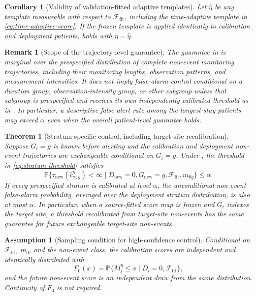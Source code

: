 \documentclass[11pt]{article}
\newtheorem{assumption}{Assumption}
\newtheorem{theorem}{Theorem}
\newtheorem{corollary}{Corollary}
\newtheorem{remark}{Remark}
\newcommand{\Pp}{\mathbb{P}}
\newcommand{\calF}{\mathcal{F}}
\begin{document}
\begin{corollary}[Validity of validation-fitted adaptive templates]\label{cor:adaptive}
Let $\widehat\eta$ be any template measurable with respect to $\calF_{\mathrm{fit}}$, including the time-adaptive template in \eqref{eq:time-adaptive-score}. If the frozen template is applied identically to calibration and deployment patients,  holds with $\eta=\widehat\eta$.
\end{corollary}

\begin{remark}[Scope of the trajectory-level guarantee]\label{rem:marginal-scope}
The guarantee in  is marginal over the prespecified distribution of complete non-event monitoring trajectories, including their monitoring lengths, observation patterns, and measurement intensities. It does not imply false-alarm control conditional on a duration group, observation-intensity group, or other subgroup unless that subgroup is prespecified and receives its own independently calibrated threshold as in . In particular, a descriptive false-alert rate among the longest-stay patients may exceed $\alpha$ even when the overall patient-level guarantee holds.
\end{remark}

\begin{theorem}[Stratum-specific control, including target-site recalibration]\label{thm:stratum}
Suppose $G_i=g$ is known before alerting and the calibration and deployment non-event trajectories are exchangeable conditional on $G_i=g$. Under , the threshold in \eqref{eq:stratum-threshold} satisfies
\begin{equation}
\Pp\{\tau_{\mathrm{new}}(\widehat c_{\alpha,g}^{\eta})<\infty
\mid D_{\mathrm{new}}=0,G_{\mathrm{new}}=g,
\calF_{\mathrm{fit}},m_{0g}\}\le\alpha.
\label{eq:stratum-control}
\end{equation}
If every prespecified stratum is calibrated at level $\alpha$, the unconditional non-event false-alarm probability, averaged over the deployment stratum distribution, is also at most $\alpha$. In particular, when a source-fitted score map is frozen and $G_i$ indexes the target site, a threshold recalibrated from target-site non-events has the same guarantee for future exchangeable target-site non-events.
\end{theorem}

\begin{assumption}[Sampling condition for high-confidence control]\label{ass:hc}
Conditional on $\calF_{\mathrm{fit}}$, $m_0$, and the non-event class, the calibration scores are independent and identically distributed with
\[
F_0(x)=\Pp\{M_i^{\eta}\le x\mid D_i=0,\calF_{\mathrm{fit}}\},
\]
and the future non-event score is an independent draw from the same distribution. Continuity of $F_0$ is not required.
\end{assumption}
\end{document}
